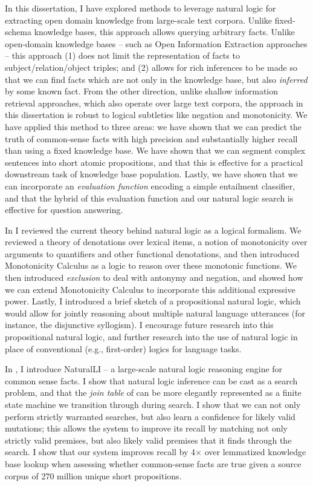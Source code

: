 In this dissertation, I have explored methods to leverage natural logic for extracting
  open domain knowledge from large-scale text corpora.
Unlike fixed-schema knowledge bases, this approach allows querying arbitrary facts.
Unlike open-domain knowledge bases -- such as Open Information Extraction approaches --
  this approach (1) does not limit the representation of facts to subject/relation/object
  triples; and (2) allows for rich inferences to be made so that we can find facts
  which are not only in the knowledge base, but also \textit{inferred} by some known
  fact.
From the other direction, unlike shallow information retrieval approaches, which also
  operate over large text corpora, the approach in this dissertation is robust to
  logical subtleties like negation and monotonicity.
We have applied this method to three areas: we have shown that we can predict the truth
  of common-sense facts with high precision and substantially higher recall than using
  a fixed knowledge base.
We have shown that we can segment complex sentences into short atomic propositions, and that
  this is effective for a practical downstream task of knowledge base population.
Lastly, we have shown that we can incorporate an \textit{evaluation function} encoding a
  simple entailment classifier, and that the hybrid of this evaluation function and
  our natural logic search is effective for question answering.

In  I reviewed the current theory behind natural logic as a logical formalism.
We reviewed a theory of denotations over lexical items, a notion of monotonicity over arguments
  to quantifiers and other functional denotations, and then introduced Monotonicity Calculus
  as a logic to reason over these monotonic functions.
We then introduced \textit{exclusion} to deal with antonymy and negation, and showed how we
  can extend Monotonicity Calculus to incorporate this additional expressive power.
Lastly, I introduced a brief sketch of a propositional natural logic, which would allow for
  jointly reasoning about multiple natural language utterances (for instance, the disjunctive
  syllogism).
I encourage future research into this propositional natural logic, and further research into
  the use of natural logic in place of conventional (e.g., first-order) logics for language
  tasks.

In , I introduce NaturalLI -- a large-scale natural logic reasoning engine
  for common sense facts.
I show that natural logic inference can be cast as a search problem, and that the \textit{join table}
  of  can be more elegantly represented as a finite state
  machine we transition through during search.
I show that we can not only perform strictly warranted searches, but also learn a confidence for
  likely valid mutations; this allows the system to improve its recall by matching not only
  strictly valid premises, but also likely valid premises that it finds through the search.
I show that our system improves recall by 4$\times$ over lemmatized knowledge base lookup when
  assessing whether common-sense facts are true given a source corpus of 270 million unique
  short propositions.


